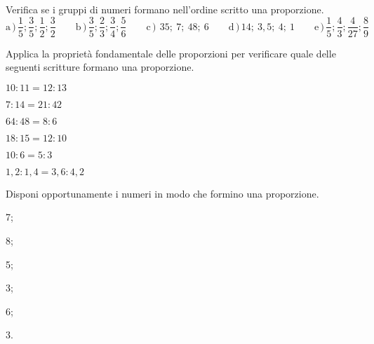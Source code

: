\subsubsection*{}

\begin{esercizio}
 \label{ese:3.115}
Verifica se i gruppi di numeri formano nell'ordine scritto una proporzione.
\[
\text{a}\,)\,\frac{1}{5}; \frac{3}{5}; \frac{1}{2}; \frac{3}{2}\qquad
\text{b}\,)\,\frac{3}{5}; \frac{2}{3}; \frac{3}{4}; \frac{5}{6}\qquad
\text{c}\,)\,~35;~7;~48;~6\qquad
\text{d}\,)\,14;~3,5;~4;~1\qquad
\text{e}\,)\,\frac{1}{5}; \frac{4}{3}; \frac{4}{27}; \frac{8}{9}
\]
\end{esercizio}

\begin{esercizio}
 \label{ese:3.116}
 Applica la proprietà fondamentale delle proporzioni per verificare quale 
 delle seguenti scritture formano una proporzione.
\begin{multicols}{2}
 \TabPositions{4cm}
 \begin{enumeratea}
 \item $10:11 =12:13$ \tab\quad\boxSi\quad\boxNo
 \item $7:14 =21:42$ \tab\quad\boxSi\quad\boxNo
 \item $64:48 =8:6$ \tab\quad\boxSi\quad\boxNo
 \item $18:15 =12:10$ \tab\quad\boxSi\quad\boxNo
 \item $10:6 =5:3$ \tab\quad\boxSi\quad\boxNo
 \item $1,2:1,4 =3,6:4,2$ \tab\quad\boxSi\quad\boxNo
 \end{enumeratea}
 \end{multicols}
\end{esercizio}

\begin{esercizio}
 \label{ese:3.117}
Disponi opportunamente i numeri in modo che formino una proporzione.
\begin{multicols}{2}
\begin{enumeratea}
\item 7;
\item 8;
\item 5;
\item 3;
\item 6;
\item 3.
\end{enumeratea}
 \end{multicols}
\end{esercizio}

